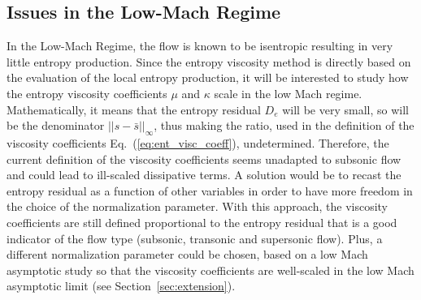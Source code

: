 \documentclass[preprint,10pt]{elsarticle}
\newcommand{\eqt}[1]{Eq.~(\ref{#1})}                     %
\newcommand{\sct}[1]{Section~\ref{#1}}                   %
\begin{document}
\subsection{Issues in the Low-Mach Regime} 
In the Low-Mach Regime, the flow is known to be isentropic resulting in very little entropy production. Since the entropy viscosity method is directly based on the evaluation of the local entropy production, it will be interested to study how the entropy viscosity coefficients $\mu$ and $\kappa$ scale in the low Mach regime. Mathematically, it means that the entropy residual $D_e$ will be very small, so will be the denominator $|| s - \bar{s} ||_{\infty}$, thus making the ratio, used in the definition of the viscosity coefficients \eqt{eq:ent_visc_coeff}, undetermined.  Therefore, the current definition of the viscosity coefficients seems unadapted to subsonic flow and could lead to ill-scaled dissipative terms. A solution would be to recast the entropy residual as a function of other variables in order to have more freedom in the choice of the normalization parameter. 
With this approach, the viscosity coefficients are still defined proportional to the entropy residual that is a good indicator of the flow type (subsonic, transonic and supersonic flow). Plus, a different normalization parameter could be chosen, based on a low Mach asymptotic study so that the viscosity coefficients are well-scaled in the low Mach asymptotic limit (see \sct{sec:extension}).
\end{document}
